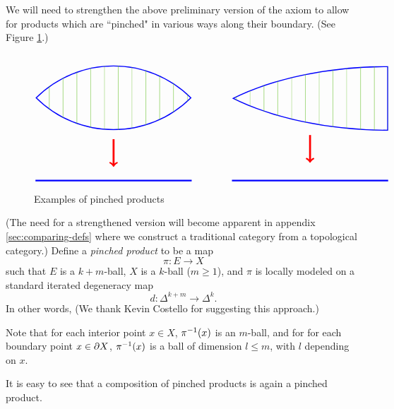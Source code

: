 We will need to strengthen the above preliminary version of the axiom to allow
for products which are ``pinched" in various ways along their boundary.
(See Figure \ref{pinched_prods}.)
\begin{figure}[t]
$$
\begin{tikzpicture}[baseline=0]
\begin{scope}
\path[clip] (0,0) arc (135:45:4) arc (-45:-135:4);
\draw[blue,line width=2pt] (0,0) arc (135:45:4) arc (-45:-135:4);
\foreach \x in {0, 0.5, ..., 6} {
	\draw[green!50!brown] (\x,-2) -- (\x,2);
}
\end{scope}
\draw[blue,line width=1.5pt] (0,-3) -- (5.66,-3);
\draw[->,red,line width=2pt] (2.83,-1.5) -- (2.83,-2.5);
\end{tikzpicture}
\qquad \qquad
\begin{tikzpicture}[baseline=-0.15cm]
\begin{scope}
\path[clip] (0,1) arc (90:135:8 and 4)  arc (-135:-90:8 and 4) -- cycle;
\draw[blue,line width=2pt] (0,1) arc (90:135:8 and 4)  arc (-135:-90:8 and 4) -- cycle;
\foreach \x in {-6, -5.5, ..., 0} {
	\draw[green!50!brown] (\x,-2) -- (\x,2);
}
\end{scope}
\draw[blue,line width=1.5pt] (-5.66,-3.15) -- (0,-3.15);
\draw[->,red,line width=2pt] (-2.83,-1.5) -- (-2.83,-2.5);
\end{tikzpicture}
$$
\caption{Examples of pinched products}\label{pinched_prods}
\end{figure}
(The need for a strengthened version will become apparent in appendix \ref{sec:comparing-defs}
where we construct a traditional category from a topological category.)
Define a {\it pinched product} to be a map
\[
	\pi: E\to X
\]
such that $E$ is a $k{+}m$-ball, $X$ is a $k$-ball ($m\ge 1$), and $\pi$ is locally modeled
on a standard iterated degeneracy map
\[
	d: \Delta^{k+m}\to\Delta^k .
\]
In other words, 
(We thank Kevin Costello for suggesting this approach.)

Note that for each interior point $x\in X$, $\pi^{-1}(x)$ is an $m$-ball,
and for for each boundary point $x\in\partial X$, $\pi^{-1}(x)$ is a ball of dimension
$l \le m$, with $l$ depending on $x$.

It is easy to see that a composition of pinched products is again a pinched product.

